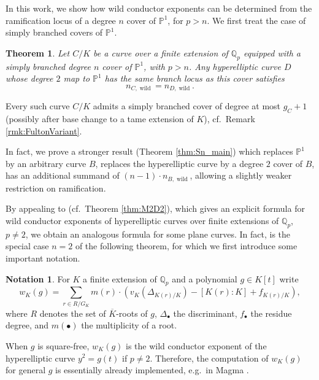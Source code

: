 \documentclass[12pt]{amsart}
\newtheorem{theorem}{Theorem}[section]
\theoremstyle{definition}
\newtheorem*{notation}{Notation}
\newenvironment{remark}
  {\pushQED{\qed}\renewcommand{\qedsymbol}{$\diamondsuit$}\remarkx}
  {\popQED\endremarkx}
\theoremstyle{remark}
\newcommand{\QQ}{\mathbb{Q}}
\newcommand{\Proj}{\mathbb{P}}
\DeclareMathOperator{\wild}{wild}
\renewcommand{\bar}{\overline}
\begin{document}
In this work, we show how wild conductor exponents can be determined from the ramification locus of a degree $n$ cover of $\Proj^1$, for $p>n$. We first treat the case of simply branched covers of $\Proj^1$.

\begin{theorem}\label{thm:1}
    Let $C/K$ be a curve over a finite extension of $\QQ_p$ equipped with a simply branched degree $n$ cover of $\Proj^1$, with $p>n$. Any hyperelliptic curve $D$ whose degree $2$ map to $\Proj^1$ has the same branch locus as this cover satisfies
    \[n_{C,\wild}=n_{D,\wild}.\]
\end{theorem}

\begin{remark}
    Every such curve $C/K$ admits a simply branched cover of degree at most $g_C+1$ (possibly after base change to a tame extension of $K$), cf.\ Remark \ref{rmk:FultonVariant}.
\end{remark}

In fact, we prove a stronger result (Theorem \ref{thm:Sn_main}) which replaces $\Proj^1$ by an arbitrary curve $B$, replaces the hyperelliptic curve by a degree $2$ cover of $B$, has an additional summand of $(n-1)\cdot n_{B,\wild}$, allowing a slightly weaker restriction on ramification.

By appealing to \cite[Theorem 11.3]{M2D2} (cf.\ Theorem \ref{thm:M2D2}), which gives an explicit formula for wild conductor exponents of hyperelliptic curves over finite extensions of $\QQ_p$, $p\ne2$, we obtain an analogous formula for some plane curves. In fact, \cite[Theorem 11.3]{M2D2} is the special case $n=2$ of the following theorem, for which we first introduce some important notation.

\begin{notation}
    For $K$ a finite extension of $\QQ_p$ and a polynomial $g\in K[t]$ write
    \[w_K(g)=\sum_{r\in R/G_{K}} m(r)\cdot(v_{K}(\Delta_{K(r)/K})-[K(r):K]+f_{K(r)/K}), \]
    where $R$ denotes the set of $\bar{K}$-roots of $g$, $\Delta_\bullet$ the discriminant, $f_\bullet$ the residue degree, and $m(\bullet)$ the multiplicity of a root.
\end{notation}

\begin{remark}\label{rem:hyperelliptic}
    When $g$ is square-free, $w_K(g)$ is the wild conductor exponent of the hyperelliptic curve $y^2=g(t)$ if $p\ne2$. Therefore, the computation of $w_K(g)$ for general $g$ is essentially already implemented, e.g.\ in Magma \cite{Magma}.
\end{remark}
\end{document}
